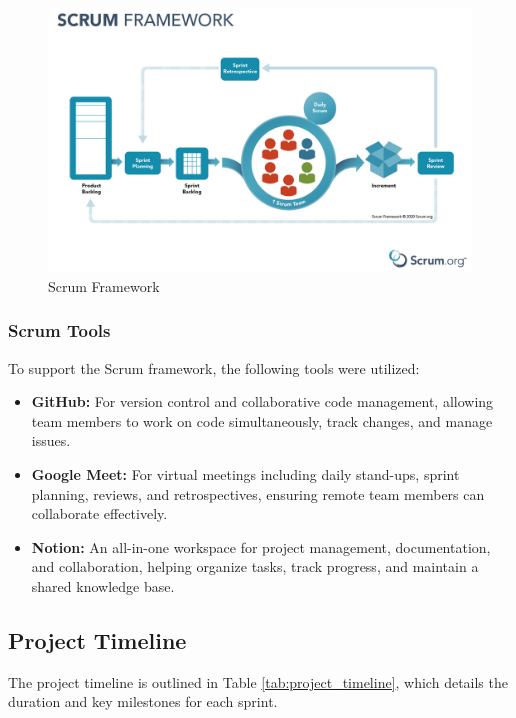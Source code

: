 \begin{figure}[H]
  \centering
  \includegraphics[width=1\textwidth]{Images/scrum.png}
  \caption{Scrum Framework}
  \label{fig:Scrum Framework}
\end{figure}

\subsubsection{Scrum Tools}
To support the Scrum framework, the following tools were utilized:
\begin{itemize}
    \item \textbf{GitHub:} For version control and collaborative code management, allowing team members to work on code simultaneously, track changes, and manage issues.
    \item \textbf{Google Meet:} For virtual meetings including daily stand-ups, sprint planning, reviews, and retrospectives, ensuring remote team members can collaborate effectively.
    \item \textbf{Notion:} An all-in-one workspace for project management, documentation, and collaboration, helping organize tasks, track progress, and maintain a shared knowledge base.
\end{itemize}

\subsection{Project Timeline}
The project timeline is outlined in Table \ref{tab:project_timeline}, which details the duration and key milestones for each sprint.

